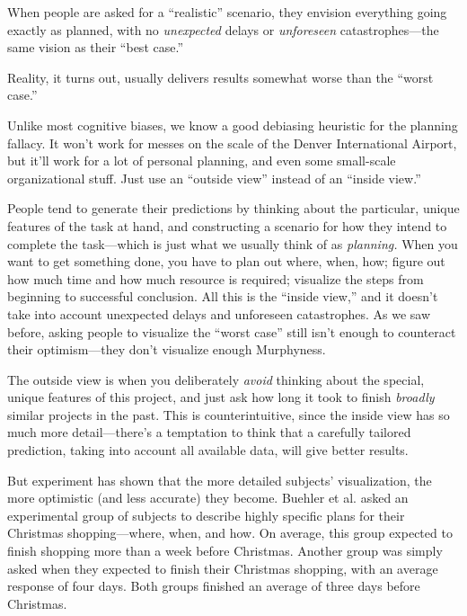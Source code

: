 {
 When people are asked for a
``realistic'' scenario, they
envision everything going exactly as planned, with no
\textit{unexpected} delays or \textit{unforeseen} catastrophes---the
same vision as their ``best case.''}

{
 Reality, it turns out, usually delivers results somewhat worse
than the ``worst case.''}

{
 Unlike most cognitive biases, we know a good debiasing heuristic
for the planning fallacy. It won't work for messes on
the scale of the Denver International Airport, but
it'll work for a lot of personal planning, and even
some small-scale organizational stuff. Just use an
``outside view'' instead of an
``inside view.''}

{
 People tend to generate their predictions by thinking about the
particular, unique features of the task at hand, and constructing a
scenario for how they intend to complete the task---which is just what
we usually think of as \textit{planning.} When you want to get
something done, you have to plan out where, when, how; figure out how
much time and how much resource is required; visualize the steps from
beginning to successful conclusion. All this is the
``inside view,'' and it
doesn't take into account unexpected delays and
unforeseen catastrophes. As we saw before, asking people to visualize
the ``worst case'' still
isn't enough to counteract their optimism---they
don't visualize enough Murphyness.}

{
 The outside view is when you deliberately \textit{avoid} thinking
about the special, unique features of this project, and just ask how
long it took to finish \textit{broadly} similar projects in the past.
This is counterintuitive, since the inside view has so much more
detail---there's a temptation to think that a carefully
tailored prediction, taking into account all available data, will give
better results.}

{
 But experiment has shown that the more detailed
subjects' visualization, the more optimistic (and less
accurate) they become. Buehler et al. asked an experimental group of
subjects to describe highly specific plans for their Christmas
shopping---where, when, and how. On average, this
group expected to finish shopping more than a week before Christmas.
Another group was simply asked when they expected to finish their
Christmas shopping, with an average response of four days. Both groups
finished an average of three days before Christmas.}

